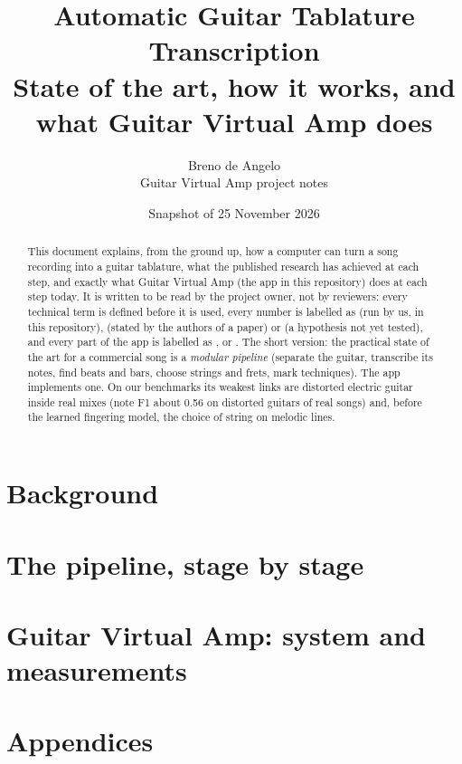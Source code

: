 \documentclass[11pt]{article}
\title{Automatic Guitar Tablature Transcription\\[4pt]
\large State of the art, how it works, and what Guitar Virtual Amp does}
\author{Breno de Angelo\\\small Guitar Virtual Amp project notes}
\date{Snapshot of 25 November 2026}
\begin{document}
\maketitle

\begin{abstract}
\noindent
This document explains, from the ground up, how a computer can turn a song
recording into a guitar tablature, what the published research has achieved at
each step, and exactly what Guitar Virtual Amp (the app in this repository)
does at each step today. It is written to be read by the project owner, not by
reviewers: every technical term is defined before it is used, every number is
labelled as \measured{} (run by us, in this repository), \reported{} (stated by
the authors of a paper) or \expected{} (a hypothesis not yet tested), and every
part of the app is labelled as \done{}, \wip{} or \planned{}. The short version:
the practical state of the art for a commercial song is a \emph{modular
pipeline} (separate the guitar, transcribe its notes, find beats and bars,
choose strings and frets, mark techniques). The app implements one. On our
benchmarks its weakest links are distorted electric guitar inside real mixes
(note F1 about 0.56 on distorted guitars of real songs) and, before the learned
fingering model, the choice of string on melodic lines.
\end{abstract}

\tableofcontents
\clearpage



\part{Background}





\part{The pipeline, stage by stage}








\part{Guitar Virtual Amp: system and measurements}




\appendix
\part*{Appendices}





\end{document}
